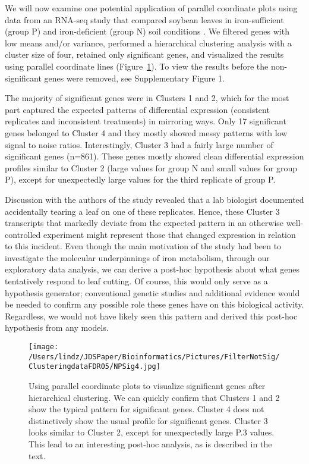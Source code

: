 \documentclass{bioinfo}
\begin{document}
We will now examine one potential application of parallel coordinate plots using data from an RNA-seq study that compared soybean leaves in iron-sufficient (group P) and iron-deficient (group N) soil conditions \citep{Lauter}. We filtered genes with low means and/or variance, performed a hierarchical clustering analysis with a cluster size of four, retained only significant genes, and visualized the results using parallel coordinate lines (Figure~\ref{clusterPCP4Sig}). To view the results before the non-significant genes were removed, see Supplementary Figure 1.

The majority of significant genes were in Clusters 1 and 2, which for the most part captured the expected patterns of differential expression (consistent replicates and inconsistent treatments) in mirroring ways. Only 17 significant genes belonged to Cluster 4 and they mostly showed messy patterns with low signal to noise ratios. Interestingly, Cluster 3 had a fairly large number of significant genes (n=861). These genes mostly showed clean differential expression profiles similar to Cluster 2 (large values for group N and small values for group P), except for unexpectedly large values for the third replicate of group P. 

Discussion with the authors of the study revealed that a lab biologist documented accidentally tearing a leaf on one of these replicates. Hence, these Cluster 3 transcripts that markedly deviate from the expected pattern in an otherwise well-controlled experiment might represent those that changed expression in relation to this incident. Even though the main motivation of the study had been to investigate the molecular underpinnings of iron metabolism, through our exploratory data analysis, we can derive a post-hoc hypothesis about what genes tentatively respond to leaf cutting. Of course, this would only serve as a hypothesis generator; conventional genetic studies and additional evidence would be needed to confirm any possible role these genes have on this biological activity. Regardless, we would not have likely seen this pattern and derived this post-hoc hypothesis from any models.

\begin{figure}[!tpb]
\centerline{\texttt{[image: /Users/lindz/JDSPaper/Bioinformatics/Pictures/FilterNotSig/ClusteringdataFDR05/NPSig4.jpg]}}
\caption{Using parallel coordinate plots to visualize significant genes after hierarchical clustering. We can quickly confirm that Clusters 1 and 2 show the typical pattern for significant genes. Cluster 4 does not distinctively show the usual profile for significant genes. Cluster 3 looks similar to Cluster 2, except for unexpectedly large P.3 values. This lead to an interesting post-hoc analysis, as is described in the text.
\label{clusterPCP4Sig}}
\end{figure}
\end{document}
